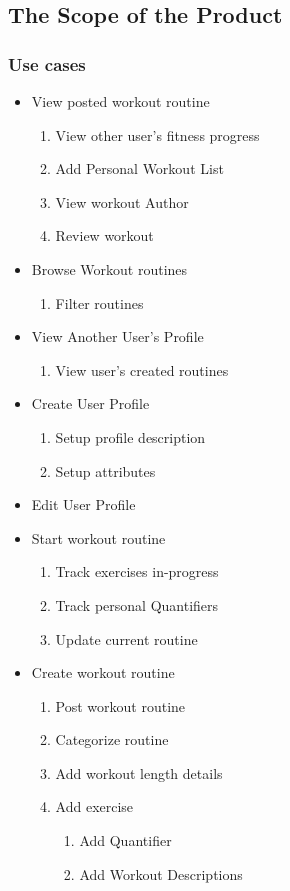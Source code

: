 \documentclass[12pt]{article}
\begin{document}
\begin{itemize}
	\subsection{The Scope of the Product}
	\subsubsection{Use cases}
	
	\begin{itemize}
		\item View posted workout routine 
		\begin{enumerate}
			\item View other user's fitness progress
			\item Add Personal Workout List
			\item View workout Author
			\item Review workout
		\end{enumerate}
		
		\item Browse Workout routines
		\begin{enumerate}
			\item Filter routines
		\end{enumerate}
		
		\item View Another User's Profile
		\begin{enumerate}
			\item View user's created routines
		\end{enumerate}
		
		\item Create User Profile
		\begin{enumerate}
			\item Setup profile description
			\item Setup attributes
		\end{enumerate}
		
		\item Edit User Profile
		
		\item Start workout routine
		\begin{enumerate}
			\item Track exercises in-progress
			\item Track personal Quantifiers
			\item Update current routine
		\end{enumerate}
		
		
		\item Create workout routine
		\begin{enumerate}
			\item Post workout routine
			\item Categorize routine
			\item Add workout length details
			\item Add exercise 
			\begin{enumerate}
				\item Add Quantifier
				\item Add Workout Descriptions
			\end{enumerate}
		\end{enumerate}
		

\end{itemize}
\end{itemize}
\end{document}
